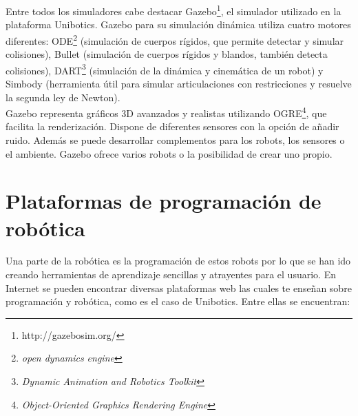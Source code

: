 Entre todos los simuladores cabe destacar Gazebo\footnote{http://gazebosim.org/}, el simulador utilizado en la plataforma Unibotics. Gazebo para su simulación dinámica utiliza cuatro motores diferentes: ODE\footnote{\textit{open dynamics engine}} (simulación de cuerpos rígidos, que permite detectar y simular colisiones), Bullet (simulación de cuerpos rígidos y blandos, también detecta colisiones), DART\footnote{\textit{Dynamic Animation and Robotics Toolkit}} (simulación de la dinámica y cinemática de un robot) y Simbody (herramienta útil para simular articulaciones con restricciones y resuelve la segunda ley de Newton)\cite{upm56724}.\\

Gazebo representa gráficos 3D avanzados y realistas utilizando OGRE\footnote{\textit{Object-Oriented Graphics Rendering Engine}}, que facilita la renderización. Dispone de diferentes sensores con la opción de añadir ruido. Además se puede desarrollar complementos para los robots, los sensores o el ambiente. Gazebo ofrece varios robots o la posibilidad de crear uno propio\cite{gaz}.
\section{Plataformas de programación de robótica}
Una parte de la robótica es la programación de estos robots por lo que se han ido creando herramientas de aprendizaje sencillas y atrayentes para el usuario. En Internet se pueden encontrar diversas plataformas web las cuales te enseñan sobre programación y robótica, como es el caso de Unibotics. Entre ellas se encuentran:

